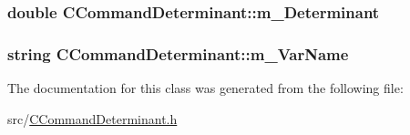 \subsubsection[{\texorpdfstring{m\+\_\+\+Determinant}{m_Determinant}}]{\setlength{\rightskip}{0pt plus 5cm}double C\+Command\+Determinant\+::m\+\_\+\+Determinant}\hypertarget{classCCommandDeterminant_a4a8778e30170613ead5997c7b18438c8}{}\label{classCCommandDeterminant_a4a8778e30170613ead5997c7b18438c8}
\subsubsection[{\texorpdfstring{m\+\_\+\+Var\+Name}{m_VarName}}]{\setlength{\rightskip}{0pt plus 5cm}string C\+Command\+Determinant\+::m\+\_\+\+Var\+Name\hspace{0.3cm}{\ttfamily [private]}}\hypertarget{classCCommandDeterminant_aa5df4a490c14743c5d6a4e65df406bc3}{}\label{classCCommandDeterminant_aa5df4a490c14743c5d6a4e65df406bc3}


The documentation for this class was generated from the following file\+:\begin{DoxyCompactItemize}
\item 
src/\hyperlink{CCommandDeterminant_8h}{C\+Command\+Determinant.\+h}\end{DoxyCompactItemize}
